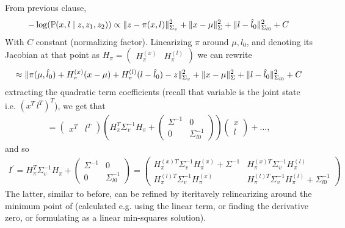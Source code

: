 \documentclass[a4paper]{scrreprt}
\begin{document}
\section{}
From previous clause, 
\begin{gather}
	-\log (\prob{x,l\mid z, z_1, z_2}) \propto \nrmsq{\Sigma_v}{z-\pi(x,l)} + 
	\nrmsq{\Sigma}{x-\mu} + \nrmsq{\Sigma_{l0}}{l-\hat{l}_0} + C
\end{gather}
With $C$ constant (normalizing factor). Linearizing $\pi$ around $\mu, 
\hat{l}_0$, and denoting 
its Jacobian at that 
point as ${H_\pi = \begin{pmatrix}
H_\pi^{(x)} & H_\pi^{(l)}
\end{pmatrix}}$ we can rewrite
\begin{gather}
	\approx 
	\nrmsq{\Sigma_v}{\pi(\mu,\hat{l}_0)+H_\pi^{(x)}(x-\mu)+H_\pi^{(l)}(l-\hat{l}_0)-z}
	 + \nrmsq{\Sigma}{x-\mu} + \nrmsq{\Sigma_{l0}}{l-\hat{l}_0} + C
	 \label{eq:1d-joint-log-posterior}
\end{gather}
extracting the quadratic term coefficients (recall that variable is the joint 
state  
i.e. $(x^T\, l^T)^T$), we get that 
\begin{gather}
	= \begin{pmatrix}
	x^T & l^T
	\end{pmatrix}
	\left(
	H_\pi^T \Sigma_v^{-1} H_\pi
	+ \begin{pmatrix}
	\Sigma^{-1} & 0 \\ 0 & \Sigma^{-1}_{l0}
	\end{pmatrix}
	\right)
	\begin{pmatrix}
		x \\ l
		\end{pmatrix} + \dots , 
\end{gather}
and so
\begin{gather}
	I^\prime = H_\pi^T \Sigma_v^{-1} H_\pi
		+ \begin{pmatrix}
		\Sigma^{-1} & 0 \\ 0 & \Sigma^{-1}_{l0}
		\end{pmatrix}
		= \begin{pmatrix}
				H_\pi^{(x)T} \Sigma_v^{-1} H_\pi^{(x)} + \Sigma^{-1} & 
				H_\pi^{(x)T} \Sigma_v^{-1} H_\pi^{(l)} \\ 
				H_\pi^{(l)T} \Sigma_v^{-1} H_\pi^{(x)} & 
				H_\pi^{(l)T} \Sigma_v^{-1} H_\pi^{(l)} + \Sigma^{-1}_{l0}
				\end{pmatrix}
\end{gather}
The latter, similar to before, can be refined by iteritavely relinearizing 
around the minimum point 
of  (calculated e.g. using the linear term, or 
finding the derivative zero, or formulating as a linear min-squares solution).
\end{document}
